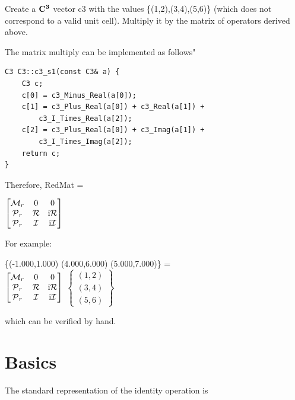 \documentclass[]{iucr}              %
\numberwithin{equation}{section}
\newcommand{\CIII}[0]{$\bf{C^{3}}$}
\newcommand{\Imaginary}[0]{\mathcal{I}}
\newcommand{\Real}[0]{\mathcal{R}}
\begin{document}
Create a \CIII{} vector c3 with
the values \{(1,2),(3,4),(5,6)\} (which does not
correspond to a valid unit cell). Multiply it by the matrix
of operators derived above.

The matrix multiply can be implemented as follows"


\begin{verbatim}
C3 C3::c3_s1(const C3& a) {
    C3 c;
    c[0] = c3_Minus_Real(a[0]);
    c[1] = c3_Plus_Real(a[0]) + c3_Real(a[1]) +
        c3_I_Times_Real(a[2]);
    c[2] = c3_Plus_Real(a[0]) + c3_Imag(a[1]) +
        c3_I_Times_Imag(a[2]);
    return c;
}
\end{verbatim}

Therefore, RedMat = \\
\begin{center}
	$\begin{bmatrix}
	\Minus{}_r	& 0			& 0 \\
	\Plus{}_r	&  \Real{}	& \textrm{i}\Real{} \\
	\Plus{}_r	& \Imaginary{}		&\textrm{i}\Imaginary{}
\end{bmatrix}	$
\end{center}

For example:

\begin{center}
\{(-1.000,1.000) (4.000,6.000) (5.000,7.000)\} =\\
$\begin{bmatrix}
	\Minus{}_r	& 0			& 0 \\
	\Plus{}_r	&  \Real{}	& \textrm{i}\Real{} \\
	\Plus{}_r	& \Imaginary{}		&\textrm{i}\Imaginary{}
\end{bmatrix}	$
$\begin{Bmatrix}
	(1,2)\\
	(3,4)\\
	(5,6)
\end{Bmatrix}$\\

\end{center}

which can be verified by hand.


	
	\section{Basics}
	
	The standard representation of the identity operation is\\
	
\end{document}
